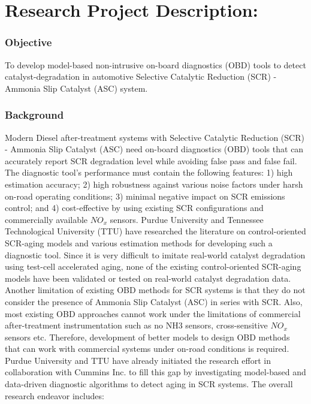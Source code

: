 \part*{Research Project Description:}

\section{Objective}
To develop model-based non-intrusive on-board diagnostics (OBD) tools to detect
catalyst-degradation in automotive Selective Catalytic Reduction (SCR) - Ammonia
Slip Catalyst (ASC) system.

\section{Background}
Modern Diesel after-treatment systems with Selective Catalytic Reduction (SCR)
- Ammonia Slip Catalyst (ASC) need on-board diagnostics (OBD) tools that can
accurately report SCR degradation level while avoiding false pass and false
fail. The diagnostic tool's performance must contain the following features: 1)
high estimation accuracy; 2) high robustness against various noise factors
under harsh on-road operating conditions; 3) minimal negative impact on SCR
emissions control; and 4) cost-effective by using existing SCR configurations
and commercially available $NO_x$ sensors. Purdue University and Tennessee
Technological University (TTU) have researched the literature on
control-oriented SCR-aging models and various estimation methods for developing
such a diagnostic tool. Since it is very difficult to imitate real-world
catalyst degradation using test-cell accelerated aging, none of the existing
control-oriented SCR-aging models have been validated or tested on real-world
catalyst degradation data. Another limitation of existing OBD methods for SCR
systems is that they do not consider the presence of Ammonia Slip Catalyst
(ASC) in series with SCR. Also, most existing OBD approaches cannot work under
the limitations of commercial after-treatment instrumentation such as no NH3
sensors, cross-sensitive $NO_x$ sensors etc. Therefore, development of better
models to design OBD methods that can work with commercial systems under
on-road conditions is required. Purdue University and TTU have already
initiated the research effort in collaboration with Cummins Inc. to fill this
gap by investigating model-based and data-driven diagnostic algorithms to
detect aging in SCR systems. The overall research endeavor includes:


